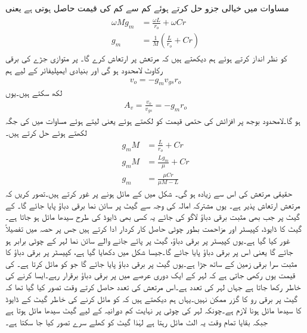 مساوات  میں خیالی جزو حل کرتے ہوئے کم سے کم  کی قیمت حاصل ہوتی ہے یعنی
\begin{gather}
\begin{aligned}\label{مساوات_مرتعش_ہمسر_حقیقی_اجزاء}
\omega M g_m &= \frac{\omega L}{r_o}+\omega C r\\
g_m&=\frac{1}{M} \left(\frac{L}{r_o}+Cr \right )
\end{aligned}
\end{gather}
 کو نظر انداز کرتے ہوئے ہم دیکھتے ہیں کہ مرتعش  پر ارتعاش کرے گا۔ پر متوازی جڑے  کی برقی رکاوٹ لامحدود ہو گی اور بنیادی ایمپلیفائر کے لیے ہم
\begin{align*}
v_o=-g_m v_{gs} r_o
\end{align*}
لکھ سکتے ہیں۔یوں 
\begin{align*}
A_v=\frac{v_o}{v_{gs}}=-g_m r_o
\end{align*}
ہو گا۔لامحدود بوجھ پر افزائش کی حتمی قیمت کو  لکھتے ہوئے یعنی  لیتے ہوئے مساوات  میں  کی جگہ  لکھتے ہوئے حل کرتے ہیں۔
\begin{align*}
g_m M&= \frac{L}{r_o}+Cr \\
g_m M&=\frac{L g_m}{\mu}+Cr\\
g_m&=\frac{\mu C r}{\mu M-L}
\end{align*}
حقیقی مرتعش کی  اس سے زیادہ ہو گی۔
%
شکل  میں  کے مائل ہونے پر غور کرتے ہیں۔تصور کریں کہ  مرتعش ارتعاش پذیر ہے۔ یوں مشترکہ امالہ کی وجہ سے  گیٹ پر سائن نما برقی دباؤ  پایا جائے گا۔ کے گیٹ پر جب بھی مثبت برقی دباؤ لاگو کی جائے یہ کسی بھی ڈایوڈ کی طرح سیدھا مائل ہو جاتا ہے۔گیٹ کا ڈایوڈ، کپیسٹر  اور مزاحمت  بطور چوٹی حاصل کار کردار ادا کرتے ہیں جس پر حصہ  میں تفصیلاً غور کیا گیا ہے۔یوں کپیسٹر  پر برقی دباؤ، گیٹ پر پائے جانے والے سائن نما لہر کے چوٹی برابر ہو جائے گا یعنی اس پر  برقی دباؤ پایا جائے گا۔جیسا شکل میں دکھایا گیا ہے، کپیسٹر پر برقی دباؤ کا مثبت سرا برقی زمین کے ساتھ جڑا ہے۔یوں گیٹ پر  برقی دباؤ پایا جائے گا جو  کو مائل کرتا ہے۔ کی قیمت یوں رکھی جاتی ہے کہ  لہر کے ایک دوری عرصے میں  پر برقی دباؤ برقرار رہے۔ایسا کرنے کی خاطر   رکھا جاتا ہے جہاں  لہر کی تعدد ہے۔اس مرتعش کی تعدد حاصل کرتے وقت تصور کیا گیا تھا کہ گیٹ پر برقی رو کا گزر ممکن نہیں۔یہاں ہم دیکھتے ہیں کہ  کو مائل کرنے کی خاطر گیٹ کے ڈایوڈ کا سیدھا مائل ہونا لازم ہے۔چونکہ لہر کی چوٹی پر نہایت کم دورانیہ کے لیے گیٹ سیدھا مائل ہوتا ہے جبکہ بقایا تمام وقت یہ الٹ مائل رہتا ہے لہٰذا گیٹ کو کھلے سرے تصور کیا جا سکتا ہے۔

